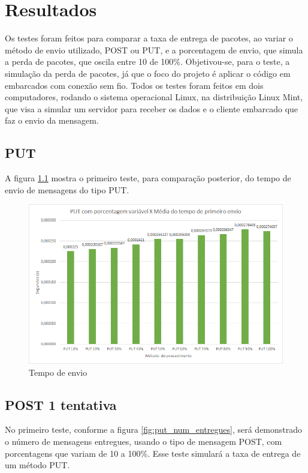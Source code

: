 \chapter{Resultados}

Os testes foram feitos para comparar a taxa de entrega de pacotes, ao variar o método de envio utilizado, POST ou PUT, e a porcentagem de envio, que simula a perda de pacotes, que oscila entre 10 de 100\%.
Objetivou-se, para o teste, a simulação da perda de pacotes, já que o foco do projeto é aplicar o código em embarcados com conexão sem fio.
Todos os testes foram feitos em dois computadores, rodando o sistema operacional Linux, na distribuição Linux Mint, que visa a simular um servidor para receber os dados e o cliente embarcado que faz o envio da mensagem.

\section{PUT}

A figura \ref{fig:put_tempo_envio} mostra o primeiro teste, para comparação posterior, do tempo de envio de mensagens do tipo PUT.

\begin{figure}[!htb]
	\centering
	\includegraphics[width=.8\textwidth]{../imagens/PUTxPrimeiroEnvio}
	\caption{Tempo de envio}
	\label{fig:put_tempo_envio}
\end{figure}

\section{POST 1 tentativa}
No primeiro teste, conforme a figura \ref{fig:put_num_entregues},
será demonstrado o número de mensagens entregues, usando o tipo de mensagem POST, com porcentagens que variam de 10 a 100\%.
Esse teste simulará a taxa de entrega de um método PUT.

